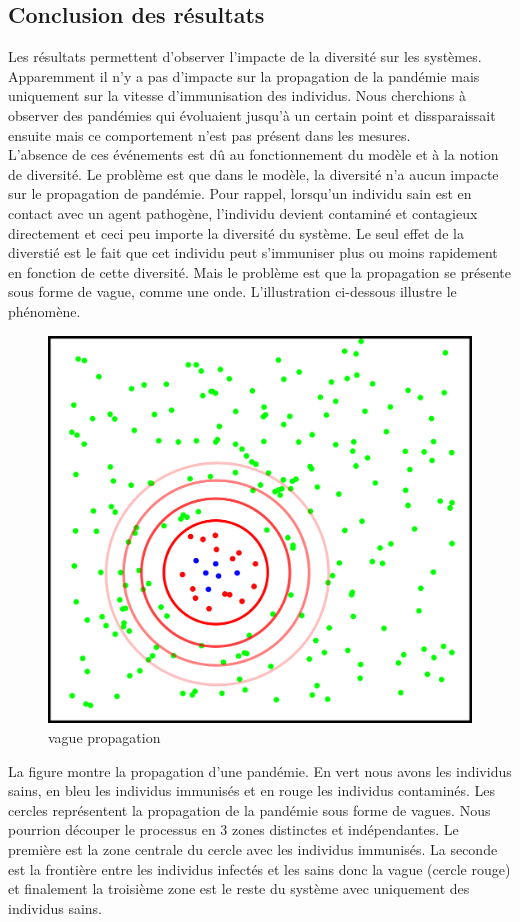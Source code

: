 \subsection{Conclusion des résultats}

Les résultats permettent d'observer l'impacte de la diversité sur les systèmes. Apparemment il n'y a pas d'impacte sur la propagation de la pandémie mais uniquement sur la vitesse d'immunisation des individus. Nous cherchions à observer des pandémies qui évoluaient jusqu'à un certain point et dissparaissait ensuite mais ce comportement n'est pas présent dans les mesures.\\

L'absence de ces événements est dû au fonctionnement du modèle et à la notion de diversité. Le problème est que dans le modèle, la diversité n'a aucun impacte sur le propagation de pandémie. Pour rappel, lorsqu'un individu sain est en contact avec un agent pathogène, l'individu devient contaminé et contagieux directement et ceci peu importe la diversité du système. Le seul effet de la diverstié est le fait que cet individu peut s'immuniser plus ou moins rapidement en fonction de cette diversité. Mais le problème est que la propagation se présente sous forme de vague, comme une onde. L'illustration ci-dessous illustre le phénomène.

\newpage

\begin{figure}[h]
	\centering
	\captionsetup{justification=centering}
	\includegraphics[width=.5\textwidth]{Images/vague_propagation.png}
	\caption{vague propagation}
\end{figure}

La figure montre la propagation d'une pandémie. En vert nous avons les individus sains, en bleu les individus immunisés et en rouge les individus contaminés. Les cercles représentent la propagation de la pandémie sous forme de vagues. Nous pourrion découper le processus en 3 zones distinctes et indépendantes. Le première est la zone centrale du cercle avec les individus immunisés. La seconde est la frontière entre les individus infectés et les sains donc la vague (cercle rouge) et finalement la troisième zone est le reste du système avec uniquement des individus sains.\\

